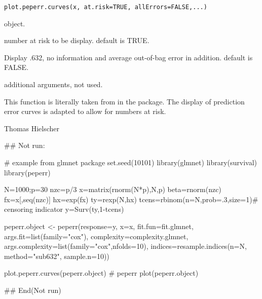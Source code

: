 \documentclass[letterpaper]{book}
\begin{document}
%
\begin{Usage}
\begin{verbatim}
plot.peperr.curves(x, at.risk=TRUE, allErrors=FALSE,...)
\end{verbatim}
\end{Usage}
%
\begin{Arguments}
\begin{ldescription}
\item[\code{x}]  object.
\item[\code{at.risk}] number at risk to be display. default is TRUE.
\item[\code{allErrors}] Display .632, no information and average out-of-bag error in addition. default is FALSE.
\item[\code{...}] additional arguments, not used.

\end{ldescription}
\end{Arguments}
%
\begin{Details}\relax
This function is literally taken from  in the  package.
The display of prediction error curves is adapted to allow for numbers at risk.
\end{Details}
%
\begin{Author}\relax
Thomas Hielscher 
\end{Author}
%
\begin{SeeAlso}\relax
{}
\end{SeeAlso}
%
\begin{Examples}
\begin{ExampleCode}
## Not run: 

# example from glmnet package
set.seed(10101)
library(glmnet)
library(survival)
library(peperr)

N=1000;p=30
nzc=p/3
x=matrix(rnorm(N*p),N,p)
beta=rnorm(nzc)
fx=x[,seq(nzc)]
hx=exp(fx)
ty=rexp(N,hx)
tcens=rbinom(n=N,prob=.3,size=1)# censoring indicator
y=Surv(ty,1-tcens)

peperr.object <- peperr(response=y, x=x, 
                        fit.fun=fit.glmnet, args.fit=list(family="cox"), 
                        complexity=complexity.glmnet,  
                        args.complexity=list(family="cox",nfolds=10),
                        indices=resample.indices(n=N, method="sub632", sample.n=10))

plot.peperr.curves(peperr.object)
# peperr
plot(peperr.object)

## End(Not run)
\end{ExampleCode}
\end{Examples}
\end{document}
